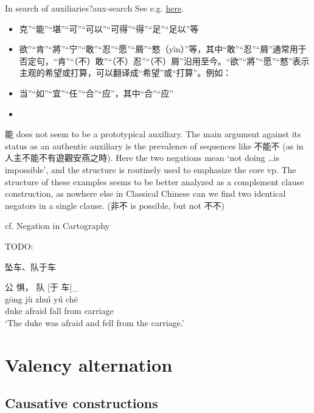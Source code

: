 \documentclass[UTF8, a4paper, oneside, scheme=plain, 12pt]{ctexrep}
\newcommand{\translate}[1]{`#1'}
\begin{document}
\begin{todobox}{In search of auxiliaries?}{aux-search}
    See e.g. \href{http://www.ziyexing.com/files-5/guhanyu/guhanyu_3_1.htm}{here}.
    \begin{itemize}
        \item 克”“能”“堪”“可”“可以”“可得”“得”“足”“足以”等
        \item 欲”“肯”“將”“宁”“敢”“忍”“愿”“屑”“憗（yìn）”等，其中“敢”“忍”“屑”通常用于否定句，“肯”“（不）敢”“（不）忍”“（不）屑”沿用至今。“欲”“將”“愿”“憗”表示主观的希望或打算，可以翻译成“希望”或“打算”。例如：
        \item 当”“如”“宜”“任”“合”“应”，其中“合”“应”
        \item 
    \end{itemize}
    
    能 does not seem to be a prototypical auxiliary.
    The main argument against its status as an authentic auxiliary is the prevalence of sequences like 不能不 (as in 人主不能不有遊觀安燕之時).
    Here the two negations mean \translate{not doing \dots is impossible},
    and the structure is routinely used to emphasize the core \ac{vp}.
    The structure of these examples seems to be better analyzed as a complement clause construction,
    as nowhere else in Classical Chinese can we find two identical negators in a single clause.
    (非不 is possible, but not 不不)

    cf. Negation in Cartography
\end{todobox}

TODO: 

坠车、队于车

\begin{exe}
\ex\label{ex:grammatical.clause.verbal.argument.prepositional.fall.1} 
    \glll 公 惧， 队 [于 车]_{\textbf{}} \\
    gōng jù zhuì yú chē \\
    duke afraid fall from carriage \\
    \glt\translate{The duke was afraid and fell from the carriage.}
\end{exe}

\chapter{Valency alternation}

\section{Causative constructions}\label{sec:grammatical.clause.verbal.argument-structure.causative}
\end{document}
